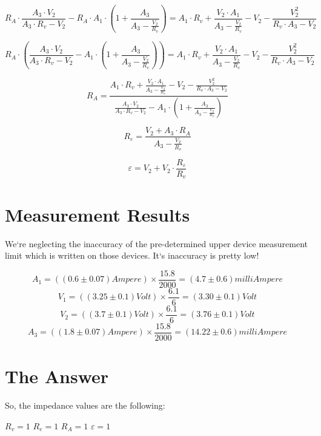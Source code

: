 \documentclass[12pt]{memoir}
\begin{document}
    \begin{equation*}
        R_A \cdot \frac{A_3 \cdot V_2}{A_3 \cdot R_v - V_2} - R_A \cdot A_1 \cdot \left( 1 + \frac{A_3}{A_3 - \frac{V_2}{R_v}} \right) = A_1 \cdot R_v + \frac{V_2 \cdot A_1}{A_3 - \frac{V_2}{R_v}} - V_2 - \frac{V_2^2}{R_v \cdot A_3 - V_2}
    \end{equation*}

    \begin{equation*}
        R_A \cdot \left( \frac{A_3 \cdot V_2}{A_3 \cdot R_v - V_2} - A_1 \cdot \left( 1 + \frac{A_3}{A_3 - \frac{V_2}{R_v}} \right) \right) = A_1 \cdot R_v + \frac{V_2 \cdot A_1}{A_3 - \frac{V_2}{R_v}} - V_2 - \frac{V_2^2}{R_v \cdot A_3 - V_2}
    \end{equation*}

    \begin{equation*}
        R_A = \frac{A_1 \cdot R_v + \frac{V_2 \cdot A_1}{A_3 - \frac{V_2}{R_v}} - V_2 - \frac{V_2^2}{R_v \cdot A_3 - V_2}}{\frac{A_3 \cdot V_2}{A_3 \cdot R_v - V_2} - A_1 \cdot \left( 1 + \frac{A_3}{A_3 - \frac{V_2}{R_v}} \right)}
    \end{equation*}

    \begin{equation*}
        R_\varepsilon = \frac{V_2 + A_3 \cdot R_A}{A_3 - \frac{V_2}{R_v}}
    \end{equation*}

    \begin{equation*}
        \varepsilon = V_2 + V_2 \cdot \frac{R_\varepsilon}{R_v}
    \end{equation*}




    \section{Measurement Results}\label{sec:measurement-results}

    We`re neglecting the inaccuracy of the pre-determined upper device measurement limit which is written on those devices.
    It`s inaccuracy is pretty low!

    \begin{equation*}
        A_1 = \left( \left(0.6 \pm 0.07 \right) Ampere \right) \times \frac{15.8}{2000} = \left(4.7 \pm 0.6 \right) milliAmpere
    \end{equation*}
    \begin{equation*}
        V_1 = \left( \left(3.25 \pm 0.1 \right) Volt \right) \times \frac{6.1}{6} = \left(3.30 \pm 0.1 \right) Volt
    \end{equation*}
    \begin{equation*}
        V_2 = \left( \left(3.7 \pm 0.1 \right) Volt \right) \times \frac{6.1}{6} = \left(3.76 \pm 0.1 \right) Volt
    \end{equation*}
    \begin{equation*}
        A_3 = \left( \left(1.8 \pm 0.07 \right) Ampere \right) \times \frac{15.8}{2000} = \left(14.22 \pm 0.6 \right) milliAmpere
    \end{equation*}


    \section{The Answer}\label{sec:answer}
So, the impedance values are the following:

$R_v = 1$
$R_e = 1$
$R_A = 1$
$\varepsilon = 1$
\end{document}
